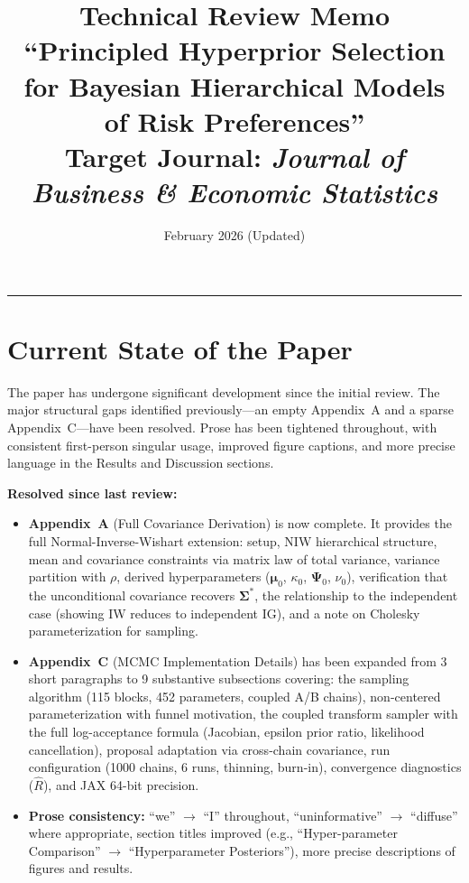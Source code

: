 \documentclass[12pt,a4paper]{article}
\title{Technical Review Memo\\[6pt]
\large ``Principled Hyperprior Selection for Bayesian Hierarchical Models\\
of Risk Preferences''\\[6pt]
\normalsize Target Journal: \textit{Journal of Business \& Economic Statistics}}
\author{}
\date{February 2026 (Updated)}
\begin{document}
\maketitle
\thispagestyle{empty}

\vspace{1em}
\hrule
\vspace{1em}

\section{Current State of the Paper}

The paper has undergone significant development since the initial review.  The
major structural gaps identified previously---an empty Appendix~A and a sparse
Appendix~C---have been resolved.  Prose has been tightened throughout, with
consistent first-person singular usage, improved figure captions, and more
precise language in the Results and Discussion sections.

\textbf{Resolved since last review:}
\begin{itemize}[leftmargin=1.5em]
\item \textbf{Appendix~A} (Full Covariance Derivation) is now complete.  It
provides the full Normal-Inverse-Wishart extension: setup, NIW hierarchical
structure, mean and covariance constraints via matrix law of total variance,
variance partition with $\rho$, derived hyperparameters
($\boldsymbol{\mu}_0$, $\kappa_0$, $\boldsymbol{\Psi}_0$, $\nu_0$),
verification that the unconditional covariance recovers $\boldsymbol{\Sigma}^*$,
the relationship to the independent case (showing IW reduces to independent
IG), and a note on Cholesky parameterization for sampling.

\item \textbf{Appendix~C} (MCMC Implementation Details) has been expanded from
3 short paragraphs to 9 substantive subsections covering: the sampling
algorithm (115 blocks, 452 parameters, coupled A/B chains), non-centered
parameterization with funnel motivation, the coupled transform sampler with the
full log-acceptance formula (Jacobian, epsilon prior ratio, likelihood
cancellation), proposal adaptation via cross-chain covariance, run
configuration (1000 chains, 6 runs, thinning, burn-in), convergence diagnostics
($\hat{R}$), and JAX 64-bit precision.

\item \textbf{Prose consistency:} ``we'' $\to$ ``I'' throughout, ``uninformative''
$\to$ ``diffuse'' where appropriate, section titles improved (e.g.,
``Hyper-parameter Comparison'' $\to$ ``Hyperparameter Posteriors''), more precise
descriptions of figures and results.
\end{itemize}
\end{document}
